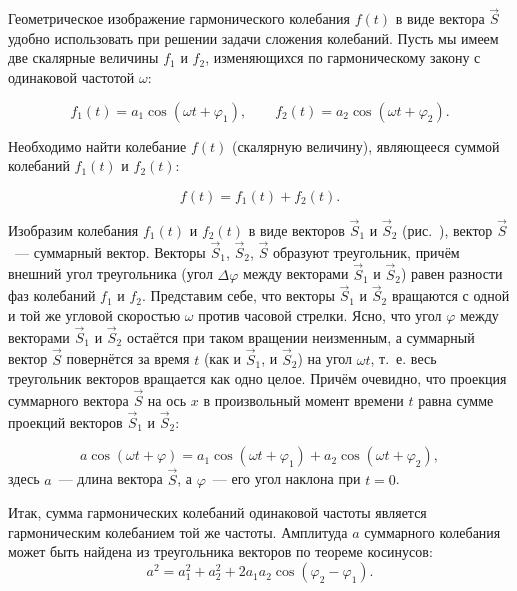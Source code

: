 Геометрическое изображение гармонического колебания $f(t)$ в виде вектора
$\vec{S}$ удобно использовать при решении задачи
сложения колебаний. Пусть мы имеем две скалярные величины $f_1$ и $f_2$,
изменяющихся по гармоническому закону с
одинаковой частотой $\omega$:

\begin{equation*}
    f_1(t)=a_1\cos(\omega t+\varphi_1), \qquad f_2(t)=a_2\cos(\omega
t+\varphi_2).
\end{equation*}

Необходимо найти колебание $f(t)$ (скалярную величину), являющееся суммой
колебаний $f_1(t)$ и $f_2(t)$:

\begin{equation*}
    f(t)=f_1(t)+f_2(t).
\end{equation*}

Изобразим колебания $f_1(t)$ и $f_2(t)$ в виде векторов $\vec{S}_1$ и
$\vec{S}_2$ (рис.~), вектор $\vec{S}$~--- суммарный
вектор.
Векторы $\vec{S}_1$, $\vec{S}_2$, $\vec{S}$ образуют треугольник, причём внешний
угол треугольника (угол $\Delta\varphi$ между
векторами $\vec{S}_1$ и $\vec{S}_2$) равен разности фаз колебаний $f_1$ и $f_2$.
Представим себе, что векторы $\vec{S}_1$ и
$\vec{S}_2$ вращаются с одной и той же угловой скоростью $\omega$ против часовой
стрелки. Ясно, что угол $\varphi$ между
векторами $\vec{S}_1$ и $\vec{S}_2$ остаётся при таком вращении неизменным, а
суммарный вектор $\vec{S}$ повернётся за время
$t$ (как и $\vec{S}_1$, и $\vec{S}_2$) на угол $\omega t$, т.~е. весь
треугольник векторов вращается как одно целое. Причём
очевидно, что проекция суммарного вектора $\vec{S}$ на ось $x$ в произвольный
момент времени $t$ равна сумме проекций
векторов $\vec{S}_1$ и $\vec{S}_2$:

\begin{equation*}
    a\cos(\omega t + \varphi)=a_1\cos(\omega t+\varphi_1)+a_2\cos(\omega t +
\varphi_2),
\end{equation*}
здесь $a$~--- длина вектора $\vec{S}$, а $\varphi$~--- его угол наклона при $t =
0$.

Итак, сумма гармонических колебаний одинаковой частоты является гармоническим
колебанием той же частоты. Амплитуда $a$
суммарного колебания может быть найдена из треугольника векторов по теореме
косинусов:
\begin{equation*}
    a^2=a_1^2+a_2^2+2a_1a_2\cos(\varphi_2-\varphi_1).
\end{equation*}


